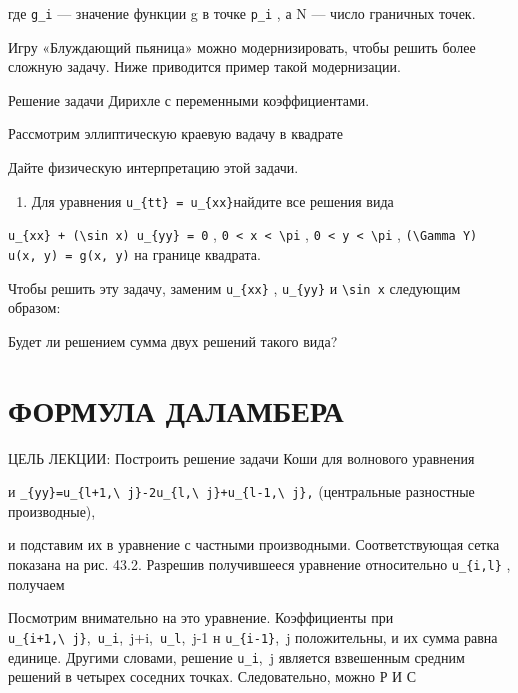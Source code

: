 \documentclass[
  ukrainian,
]{article}
\providecommand{\tightlist}{%
  \setlength{\itemsep}{0pt}\setlength{\parskip}{0pt}}
\begin{document}
где \texttt{g\_i} --- значение функции g в точке \texttt{p\_i} , а N ---
число граничных точек.

Игру «Блуждающий пьяница» можно модернизировать, чтобы решить более
сложную задачу. Ниже приводится пример такой модернизации.

Решение задачи Дирихле с переменными коэффициентами.

Рассмотрим эллиптическую краевую вадачу в квадрате

Дайте физическую интерпретацию этой задачи.

\begin{enumerate}
\def\labelenumi{\arabic{enumi}.}
\setcounter{enumi}{3}
\tightlist
\item
  Для уравнения \texttt{u\_\{tt\}\ =\ u\_\{xx\}}найдите все решения вида
\end{enumerate}

\texttt{u\_\{xx\}\ +\ (\textbackslash{}sin\ x)\ u\_\{yy\}\ =\ 0} ,
\texttt{0\ \textless{}\ x\ \textless{}\ \textbackslash{}pi} ,
\texttt{0\ \textless{}\ y\ \textless{}\ \textbackslash{}pi} ,
\texttt{(\textbackslash{}Gamma\ Y)} \texttt{u(x,\ y)\ =\ g(x,\ y)} на
границе квадрата.

Чтобы решить эту задачу, заменим \texttt{u\_\{xx\}} , \texttt{u\_\{yy\}}
и \texttt{\textbackslash{}sin\ x} следующим образом:

Будет ли решением сумма двух решений такого вида?

\section{ФОРМУЛА
ДАЛАМБЕРА}\label{ux444ux43eux440ux43cux443ux43bux430-ux434ux430ux43bux430ux43cux431ux435ux440ux430}

ЦЕЛЬ ЛЕКЦИИ: Построить решение задачи Коши для волнового уравнения

и
\texttt{\_\{yy\}=u\_\{l+1,\textbackslash{}\ j\}-2u\_\{l,\textbackslash{}\ j\}+u\_\{l-1,\textbackslash{}\ j\},}
(центральные разностные производные),

и подставим их в уравнение с частными производными. Соответствующая
сетка показана на рис. 43.2. Разрешив получившееся уравнение
относительно \texttt{u\_\{i,l\}} , получаем

Посмотрим внимательно на это уравнение. Коэффициенты при
\texttt{u\_\{i+1,\textbackslash{}\ j\}},~\texttt{u\_i},~j+i,~\texttt{u\_l},~j-1
н \texttt{u\_\{i-1\}},~j положительны, и их сумма равна единице. Другими
словами, решение \texttt{u\_i},~j является взвешенным средним решений в
четырех соседних точках. Следовательно, можно Р И С
\end{document}
